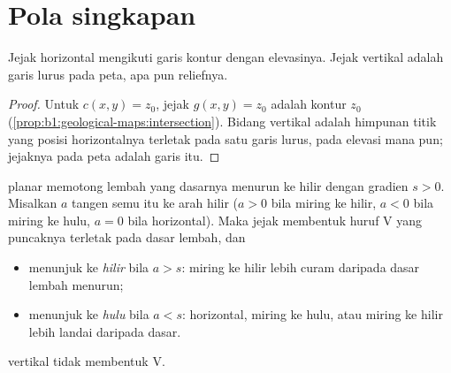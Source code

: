 \section{Pola singkapan}

\begin{proposition}\label{prop:b1:geological-maps:hv}
Jejak  horizontal mengikuti garis kontur dengan elevasinya. Jejak  vertikal adalah garis lurus pada peta, apa pun reliefnya.
\end{proposition}

\begin{proof}
Untuk $c(x,y) = z_0$, jejak $g(x,y) = z_0$ adalah kontur $z_0$
(\cref{prop:b1:geological-maps:intersection}). Bidang vertikal adalah himpunan titik yang posisi horizontalnya terletak pada satu garis lurus, pada elevasi mana pun; jejaknya pada peta adalah garis itu.
\end{proof}

\begin{theorem}[Aturan-V]\label{thm:b1:geological-maps:v-rule}
 planar memotong lembah yang dasarnya menurun ke hilir dengan gradien $s > 0$. Misalkan $a$ tangen  semu  itu ke arah hilir ($a > 0$ bila miring ke hilir, $a < 0$ bila miring ke hulu, $a = 0$ bila horizontal). Maka jejak  membentuk huruf V yang puncaknya terletak pada dasar lembah, dan
\begin{itemize}
  \item menunjuk ke \emph{hilir} bila $a > s$:  miring ke hilir lebih curam daripada dasar lembah menurun;
  \item menunjuk ke \emph{hulu} bila $a < s$:  horizontal, miring ke hulu, atau miring ke hilir lebih landai daripada dasar.
\end{itemize}
 vertikal tidak membentuk V.
\end{theorem}

